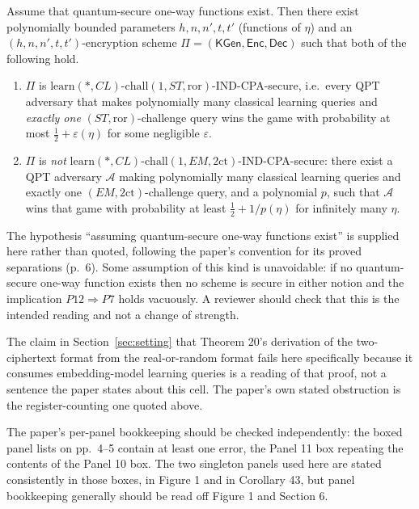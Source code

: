\documentclass{aicr-conjecture}
\newcommand{\KGen}{\mathsf{KGen}}
\newcommand{\Enc}{\mathsf{Enc}}
\newcommand{\Dec}{\mathsf{Dec}}
\newcommand{\ror}{\mathrm{ror}}
\newcommand{\twoct}{2\mathrm{ct}}
\newcommand{\learn}{\mathrm{learn}}
\newcommand{\chall}{\mathrm{chall}}
\newcommand{\NSTror}{\ensuremath{\learn(*,CL)}-\ensuremath{\chall(1,ST,\ror)}}
\newcommand{\NEMtwoct}{\ensuremath{\learn(*,CL)}-\ensuremath{\chall(1,EM,\twoct)}}
\begin{document}
\begin{conjecture}\label{conj:main}
Assume that quantum-secure one-way functions exist. Then there exist
polynomially bounded parameters $h,n,n',t,t'$ (functions of $\eta$) and
an $(h,n,n',t,t')$-encryption scheme $\Pi=(\KGen,\Enc,\Dec)$ such that
both of the following hold.
\begin{enumerate}
  \item $\Pi$ is \NSTror-IND-CPA-secure, i.e.\ every QPT adversary that
    makes polynomially many classical learning queries and \emph{exactly
    one} $(ST,\ror)$-challenge query wins the game with probability at
    most $\tfrac12+\varepsilon(\eta)$ for some negligible $\varepsilon$.
  \item $\Pi$ is \emph{not} \NEMtwoct-IND-CPA-secure: there exist a QPT
    adversary $\mathcal{A}$ making polynomially many classical learning
    queries and exactly one $(EM,\twoct)$-challenge query, and a
    polynomial $p$, such that $\mathcal{A}$ wins that game with
    probability at least $\tfrac12+1/p(\eta)$ for infinitely many
    $\eta$.
\end{enumerate}
\end{conjecture}

\begin{remark}\label{rem:owf}
The hypothesis ``assuming quantum-secure one-way functions exist'' is
supplied here rather than quoted, following the paper's convention for
its proved separations (p.~6). Some assumption of this kind is
unavoidable: if no quantum-secure one-way function exists then no scheme
is secure in either notion and the implication $P12\Rightarrow P7$ holds
vacuously. A reviewer should check that this is the intended reading and
not a change of strength.
\end{remark}

\begin{remark}\label{rem:thm20}
The claim in Section~\ref{sec:setting} that Theorem 20's derivation of
the two-ciphertext format from the real-or-random format fails here
specifically because it consumes embedding-model learning queries is a
reading of that proof, not a sentence the paper states about this cell.
The paper's own stated obstruction is the register-counting one quoted
above.
\end{remark}

\begin{remark}\label{rem:panels}
The paper's per-panel bookkeeping should be checked independently: the
boxed panel lists on pp.~4--5 contain at least one error, the Panel 11
box repeating the contents of the Panel 10 box. The two singleton panels
used here are stated consistently in those boxes, in Figure 1 and in
Corollary 43, but panel bookkeeping generally should be read off
Figure 1 and Section 6.
\end{remark}
\end{document}
